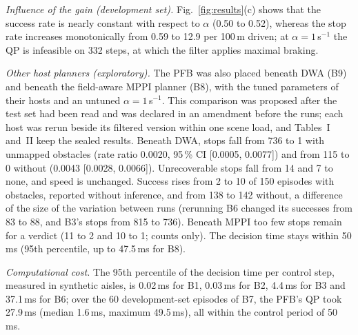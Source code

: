 \documentclass[conference]{IEEEtran}
\begin{document}
\emph{Influence of the gain (development set).} Fig.~\ref{fig:results}(c) shows that the success rate is nearly
constant with respect to $\alpha$ (0.50 to 0.52), whereas the stop rate increases monotonically from 0.59 to 12.9
per 100\,m driven; at $\alpha=1$\,s$^{-1}$ the QP is infeasible on 332 steps, at which the filter applies maximal
braking.

\emph{Other host planners (exploratory).} The PFB was also placed beneath DWA (B9) and beneath the
field-aware MPPI planner (B8), with the tuned parameters of their hosts and an untuned $\alpha=1$\,s$^{-1}$. This
comparison was proposed after the test set had been read and was declared in an amendment before the runs; each
host was rerun beside its filtered version within one scene load, and Tables~I and~II keep the sealed results.
Beneath DWA, stops fall from 736 to 1 with unmapped obstacles (rate ratio 0.0020, 95\,\% CI [0.0005, 0.0077]) and
from 115 to 0 without (0.0043 [0.0028, 0.0066]). Unrecoverable stops fall from 14 and 7 to none, and speed is
unchanged. Success rises from 2 to 10 of 150 episodes with obstacles, reported without inference, and from 138 to 142 without,
a difference of the size of the variation between runs (rerunning B6 changed its successes from 83 to 88, and
B3's stops from 815 to 736). Beneath MPPI too few stops
remain for a verdict (11 to 2 and 10 to 1; counts only). The decision time stays within 50\,ms (95th percentile, up to 47.5\,ms for B8).

\emph{Computational cost.} The 95th percentile of the decision time per control step, measured in synthetic
aisles, is 0.02\,ms for B1, 0.03\,ms for B2, 4.4\,ms for B3 and 37.1\,ms for B6; over the 60 development-set
episodes of B7, the PFB's QP took 27.9\,ms (median 1.6\,ms, maximum 49.5\,ms), all within the control period of 50\,ms.
\end{document}
